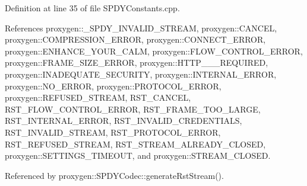 Definition at line 35 of file S\+P\+D\+Y\+Constants.\+cpp.



References proxygen\+::\+\_\+\+S\+P\+D\+Y\+\_\+\+I\+N\+V\+A\+L\+I\+D\+\_\+\+S\+T\+R\+E\+AM, proxygen\+::\+C\+A\+N\+C\+EL, proxygen\+::\+C\+O\+M\+P\+R\+E\+S\+S\+I\+O\+N\+\_\+\+E\+R\+R\+OR, proxygen\+::\+C\+O\+N\+N\+E\+C\+T\+\_\+\+E\+R\+R\+OR, proxygen\+::\+E\+N\+H\+A\+N\+C\+E\+\_\+\+Y\+O\+U\+R\+\_\+\+C\+A\+LM, proxygen\+::\+F\+L\+O\+W\+\_\+\+C\+O\+N\+T\+R\+O\+L\+\_\+\+E\+R\+R\+OR, proxygen\+::\+F\+R\+A\+M\+E\+\_\+\+S\+I\+Z\+E\+\_\+\+E\+R\+R\+OR, proxygen\+::\+H\+T\+T\+P\+\_\+\_\+\_\+\+R\+E\+Q\+U\+I\+R\+ED, proxygen\+::\+I\+N\+A\+D\+E\+Q\+U\+A\+T\+E\+\_\+\+S\+E\+C\+U\+R\+I\+TY, proxygen\+::\+I\+N\+T\+E\+R\+N\+A\+L\+\_\+\+E\+R\+R\+OR, proxygen\+::\+N\+O\+\_\+\+E\+R\+R\+OR, proxygen\+::\+P\+R\+O\+T\+O\+C\+O\+L\+\_\+\+E\+R\+R\+OR, proxygen\+::\+R\+E\+F\+U\+S\+E\+D\+\_\+\+S\+T\+R\+E\+AM, R\+S\+T\+\_\+\+C\+A\+N\+C\+EL, R\+S\+T\+\_\+\+F\+L\+O\+W\+\_\+\+C\+O\+N\+T\+R\+O\+L\+\_\+\+E\+R\+R\+OR, R\+S\+T\+\_\+\+F\+R\+A\+M\+E\+\_\+\+T\+O\+O\+\_\+\+L\+A\+R\+GE, R\+S\+T\+\_\+\+I\+N\+T\+E\+R\+N\+A\+L\+\_\+\+E\+R\+R\+OR, R\+S\+T\+\_\+\+I\+N\+V\+A\+L\+I\+D\+\_\+\+C\+R\+E\+D\+E\+N\+T\+I\+A\+LS, R\+S\+T\+\_\+\+I\+N\+V\+A\+L\+I\+D\+\_\+\+S\+T\+R\+E\+AM, R\+S\+T\+\_\+\+P\+R\+O\+T\+O\+C\+O\+L\+\_\+\+E\+R\+R\+OR, R\+S\+T\+\_\+\+R\+E\+F\+U\+S\+E\+D\+\_\+\+S\+T\+R\+E\+AM, R\+S\+T\+\_\+\+S\+T\+R\+E\+A\+M\+\_\+\+A\+L\+R\+E\+A\+D\+Y\+\_\+\+C\+L\+O\+S\+ED, proxygen\+::\+S\+E\+T\+T\+I\+N\+G\+S\+\_\+\+T\+I\+M\+E\+O\+UT, and proxygen\+::\+S\+T\+R\+E\+A\+M\+\_\+\+C\+L\+O\+S\+ED.



Referenced by proxygen\+::\+S\+P\+D\+Y\+Codec\+::generate\+Rst\+Stream().


